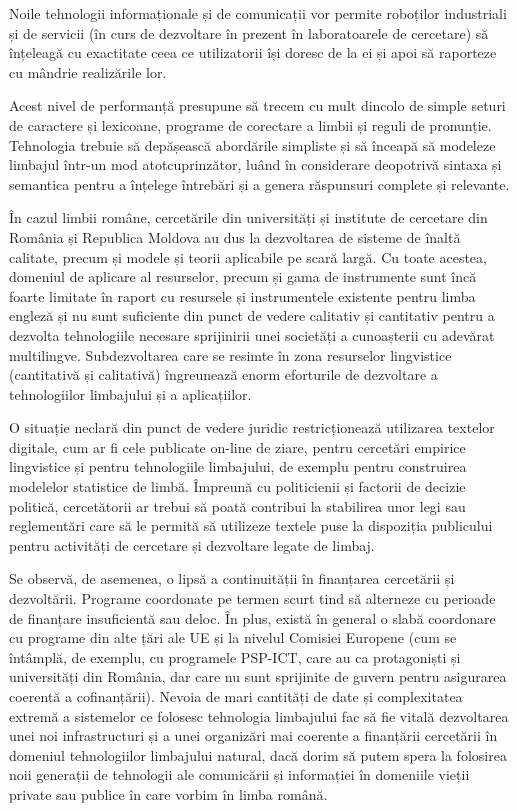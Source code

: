 \begin{multicols}{2}
Noile tehnologii informaționale și de comunicații vor permite roboților industriali și de servicii (în curs de dezvoltare în prezent în laboratoarele de cercetare) să înțeleagă cu exactitate ceea ce utilizatorii își doresc de la ei și apoi să raporteze cu mândrie realizările lor.

Acest nivel de performanță presupune să trecem cu mult dincolo de simple seturi de caractere și lexicoane, programe de corectare a limbii și reguli de pronunție. Tehnologia trebuie să depășească abordările simpliste și să înceapă să modeleze limbajul \mbox{într-un} mod atotcuprinzător, luând în considerare deopotrivă sintaxa și semantica pentru a înțelege întrebări și a genera răspunsuri complete și relevante.

În cazul limbii române, cercetările din universități și institute de cercetare din România și Republica Moldova au dus la dezvoltarea de sisteme de înaltă calitate, precum și modele și teorii aplicabile pe scară largă. Cu toate acestea, domeniul de aplicare al resurselor, precum și gama de instrumente sunt încă foarte limitate în raport cu resursele și instrumentele existente pentru limba engleză și nu sunt suficiente din punct de vedere calitativ și cantitativ pentru a dezvolta tehnologiile necesare sprijinirii unei societăți a cunoașterii cu adevărat multilingve. Subdezvoltarea care se resimte în zona resurselor lingvistice (cantitativă și calitativă) îngreunează enorm eforturile de dezvoltare a tehnologiilor limbajului și a aplicațiilor.

O situație neclară din punct de vedere juridic restricționează utilizarea textelor digitale, cum ar fi cele publicate on-line de ziare, pentru cercetări empirice lingvistice și pentru tehnologiile limbajului, de exemplu pentru construirea modelelor statistice de limbă. Împreună cu politicienii și factorii de decizie politică, cercetătorii ar trebui să poată contribui la stabilirea unor legi sau reglementări care să le permită să utilizeze textele puse la dispoziția publicului pentru activități de cercetare și dezvoltare legate de limbaj.\vspace*{0.09 cm}

Se observă, de asemenea, o lipsă a continuității în finanțarea cercetării și dezvoltării. Programe coordonate pe termen scurt tind să alterneze cu perioade de finanțare insuficientă sau deloc. În plus, există în general o slabă coordonare cu programe din alte țări ale UE și la nivelul Comisiei Europene (cum se întâmplă, de exemplu, cu programele PSP-ICT, care au ca protagoniști și universități din România, dar care nu sunt sprijinite de guvern pentru asigurarea coerentă a cofinanțării). Nevoia de mari cantități de date și complexitatea extremă a sistemelor ce folosesc tehnologia limbajului fac să fie vitală dezvoltarea unei noi infrastructuri și a unei organizări mai coerente a finanțării cercetării în domeniul tehnologiilor limbajului natural, dacă dorim să putem spera la folosirea noii generații de tehnologii ale comunicării și informației în domeniile vieții private sau publice în care vorbim în limba română.\vspace*{0.09 cm}


\end{multicols}
